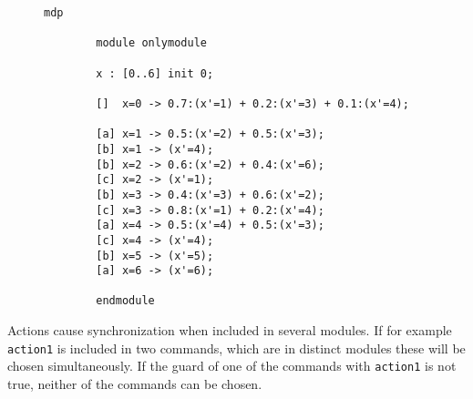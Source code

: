 \documentclass[preview]{standalone}
\begin{document}
\begin{figure}
	\begin{lstlisting}[language=prism, caption={\prism model file for the \mdpN \mdp given by Figure \ref{fig:exampleMdp}. This example has only one variable representing the six states in \mdp and the actions \texttt{a}, \texttt{b} and \texttt{c} referring to \action, \actionb, and \actionc in \mdp, which are only used for labeling here. The initial distribution has to be realized with an additional state (\texttt{x=0}).},label={lst:exmpprism}]
		mdp
		
		module onlymodule
		
		x : [0..6] init 0;
		
		[]  x=0 -> 0.7:(x'=1) + 0.2:(x'=3) + 0.1:(x'=4);
		
		[a] x=1 -> 0.5:(x'=2) + 0.5:(x'=3);
		[b] x=1 -> (x'=4);
		[b] x=2 -> 0.6:(x'=2) + 0.4:(x'=6);
		[c] x=2 -> (x'=1);
		[b] x=3 -> 0.4:(x'=3) + 0.6:(x'=2);
		[c] x=3 -> 0.8:(x'=1) + 0.2:(x'=4);
		[a] x=4 -> 0.5:(x'=4) + 0.5:(x'=3);
		[c] x=4 -> (x'=4);
		[b] x=5 -> (x'=5);
		[a] x=6 -> (x'=6);
		
		endmodule	
	\end{lstlisting}
\end{figure}

Actions cause synchronization when included in several modules. If for example \texttt{action1} is included in two commands, which are in distinct modules these will be chosen simultaneously. If the guard of one of the commands with \texttt{action1} is not true, neither of the commands can be chosen\cite{Kwiatkowska2000, Kwiatkowska2011}.


\end{document}
